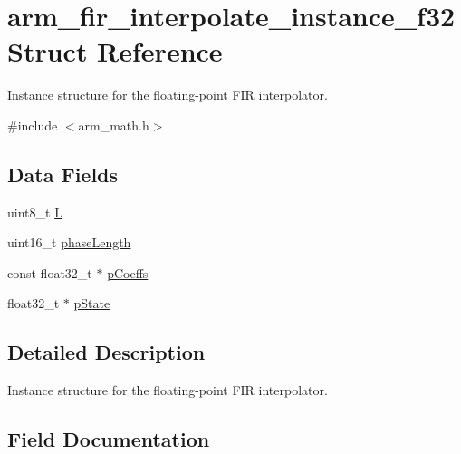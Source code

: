\hypertarget{structarm__fir__interpolate__instance__f32}{}\section{arm\+\_\+fir\+\_\+interpolate\+\_\+instance\+\_\+f32 Struct Reference}
\label{structarm__fir__interpolate__instance__f32}


Instance structure for the floating-\/point F\+IR interpolator.  




{\ttfamily \#include $<$arm\+\_\+math.\+h$>$}

\subsection*{Data Fields}
\begin{DoxyCompactItemize}
\item 
uint8\+\_\+t \mbox{\hyperlink{structarm__fir__interpolate__instance__f32_aee73cc056696e504430c53eaa9c58cf0}{L}}
\item 
uint16\+\_\+t \mbox{\hyperlink{structarm__fir__interpolate__instance__f32_a8f92bb07e0812f94679438cdf412b26a}{phase\+Length}}
\item 
const float32\+\_\+t $\ast$ \mbox{\hyperlink{structarm__fir__interpolate__instance__f32_a39230f04a29d8321948e339633780442}{p\+Coeffs}}
\item 
float32\+\_\+t $\ast$ \mbox{\hyperlink{structarm__fir__interpolate__instance__f32_a335c87e6fdc4b96601d95a5de8b9c463}{p\+State}}
\end{DoxyCompactItemize}


\subsection{Detailed Description}
Instance structure for the floating-\/point F\+IR interpolator. 

\subsection{Field Documentation}
\mbox{\label{structarm__fir__interpolate__instance__f32_aee73cc056696e504430c53eaa9c58cf0}} 
